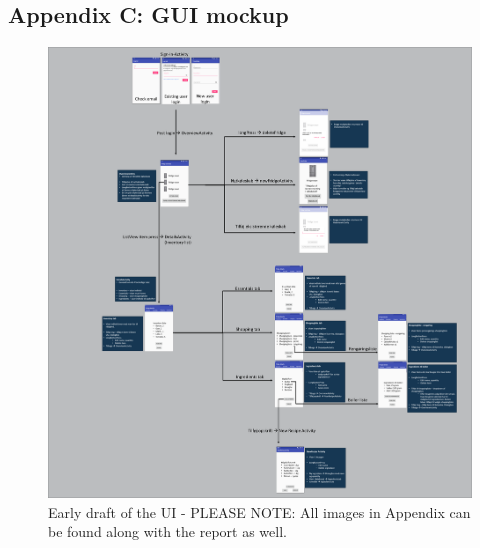 \documentclass[12pt]{article}
\begin{document}
\subsection{Appendix C: GUI mockup}
\begin{figure}[H]
	\centering
	\includegraphics[width=180mm]{Img/APPENDIX C - GUI-mockup.png}
	\caption{Early draft of the UI - PLEASE NOTE: All images in Appendix can be found along with the report as well.}
	\label{fig:GUI_mockup}
\end{figure}
\end{document}
